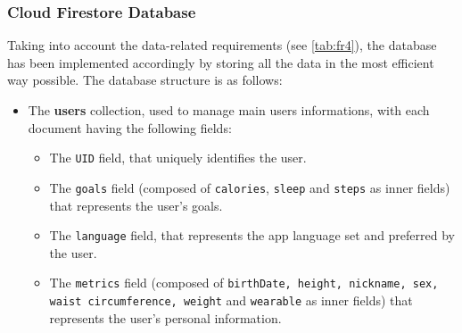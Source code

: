 \subsubsection{Cloud Firestore Database}
\label{subsubsec:cloudFirestoreDatabase}
Taking into account the data-related requirements (see \cref{tab:fr4}), the database has been implemented accordingly by storing all the data in the most efficient way possible. \newline The database structure is as follows:

\begin{itemize}[nosep] %
    \item The \textbf{users} collection, used to manage main users informations, with each document having the following fields:
    \label{subsubsec:usersCollection}
    \begin{itemize}[nosep]
        \item The \texttt{UID} field, that uniquely identifies the user.
        \item The \texttt{goals} field (composed of \texttt{calories}, \texttt{sleep} and \texttt{steps} as inner fields) that represents the user's goals.
        \item The \texttt{language} field, that represents the app language set and preferred by the user.
        \item The \texttt{metrics} field (composed of \texttt{birthDate, height, nickname, sex, waist circumference, weight} and \texttt{wearable} as inner fields) that represents the user's personal information.
    \end{itemize}
\end{itemize}

